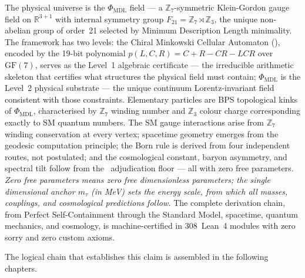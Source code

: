 \documentclass[11pt,openany]{book}
\theoremstyle{remark}
\newcommand{\PSC}{\text{PSC}}
\newcommand{\PHIMDL}{\Phi_{\mathrm{MDL}}}
\newcommand{\CMCA}{\text{CMCA}}
\newcommand{\poly}{p(L,C,R)}
\begin{document}
\begin{tcolorbox}[colback=green!5,colframe=green!50!black,
  title={The Central Claim of This Monograph}]
The physical universe is the $\PHIMDL$ field --- a $\mathbb{Z}_7$-symmetric
Klein-Gordon gauge field on $\mathbb{R}^{3+1}$ with internal symmetry group
$F_{21} = \mathbb{Z}_7 \rtimes \mathbb{Z}_3$, the unique non-abelian group of
order~21 selected by Minimum Description Length minimality.
The framework has two levels: the Chiral Minkowski Cellular Automaton (\CMCA),
encoded by the 19-bit polynomial $\poly = C{+}R{-}CR{-}LCR$ over $\mathrm{GF}(7)$,
serves as the Level~1 algebraic certificate --- the irreducible arithmetic
skeleton that certifies what structures the physical field must contain;
$\PHIMDL$ is the Level~2 physical substrate --- the unique continuum
Lorentz-invariant field consistent with those constraints.
Elementary particles are BPS topological kinks of $\PHIMDL$, characterised
by $\mathbb{Z}_7$ winding number and $\mathbb{Z}_3$ colour charge
corresponding exactly to SM quantum numbers.
The SM gauge interactions arise from $\mathbb{Z}_7$ winding conservation at
every vertex; spacetime geometry emerges from the geodesic computation
principle; the Born rule is derived from four independent routes, not
postulated; and the cosmological constant, baryon asymmetry, and spectral
tilt follow from the \PSC\ adjudication floor --- all with zero free
parameters.
\emph{Zero free parameters means zero free dimensionless parameters; the single
dimensional anchor $m_\tau$ (in MeV) sets the energy scale, from which all masses,
couplings, and cosmological predictions follow.}
The complete derivation chain, from Perfect Self-Containment through the
Standard Model, spacetime, quantum mechanics, and cosmology, is
machine-certified in 308~Lean~4 modules with zero sorry and zero custom axioms.
\end{tcolorbox}

The logical chain that establishes this claim is assembled in the following chapters.
\end{document}
